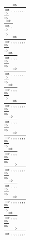 \documentclass[11pt]{article}
\begin{document}
\begin{center}
\bigskip
\\$\frac{\Rightarrow }{\Rightarrow , , , , , , , }$
\bigskip
\\$\frac{\Rightarrow }{\Rightarrow }$
\bigskip
\\$\frac{\Rightarrow }{\Rightarrow , }$
\bigskip
\\$\frac{\Rightarrow }{\Rightarrow }$
\bigskip
\\$\frac{\Rightarrow }{\Rightarrow , , , , , , , }$
\bigskip
\\$\frac{\Rightarrow }{\Rightarrow }$
\bigskip
\\$\frac{\Rightarrow }{\Rightarrow , , , }$
\bigskip
\\$\frac{\Rightarrow }{\Rightarrow }$
\bigskip
\\$\frac{\Rightarrow }{\Rightarrow , , , , , , , }$
\bigskip
\\$\frac{\Rightarrow }{\Rightarrow }$
\bigskip
\\$\frac{\Rightarrow }{\Rightarrow , , , }$
\bigskip
\\$\frac{\Rightarrow }{\Rightarrow }$
\bigskip
\\$\frac{\Rightarrow }{\Rightarrow , , , , , , , }$
\bigskip
\\$\frac{\Rightarrow }{\Rightarrow }$
\bigskip
\\$\frac{\Rightarrow }{\Rightarrow , , , }$
\bigskip
\\$\frac{\Rightarrow }{\Rightarrow }$
\bigskip
\\$\frac{\Rightarrow }{\Rightarrow , , , , , , , }$
\bigskip
\\$\frac{\Rightarrow }{\Rightarrow }$
\bigskip
\\$\frac{\Rightarrow }{\Rightarrow , , , }$
\bigskip
\\$\frac{\Rightarrow }{\Rightarrow }$
\bigskip
\\$\frac{\Rightarrow }{\Rightarrow , , , , , , , }$
\bigskip
\\$\frac{\Rightarrow }{\Rightarrow }$
\bigskip
\\$\frac{\Rightarrow }{\Rightarrow , , , }$
\bigskip
\\$\frac{\Rightarrow }{\Rightarrow }$
\bigskip
\\$\frac{\Rightarrow }{\Rightarrow , , , , , , , }$
\bigskip
\\$\frac{\Rightarrow }{\Rightarrow }$
\bigskip
\\$\frac{\Rightarrow }{\Rightarrow , , , }$
\bigskip
\\$\frac{\Rightarrow }{\Rightarrow }$
\bigskip
\\$\frac{\Rightarrow }{\Rightarrow , , , , , , , }$

\end{center}
\end{document}
